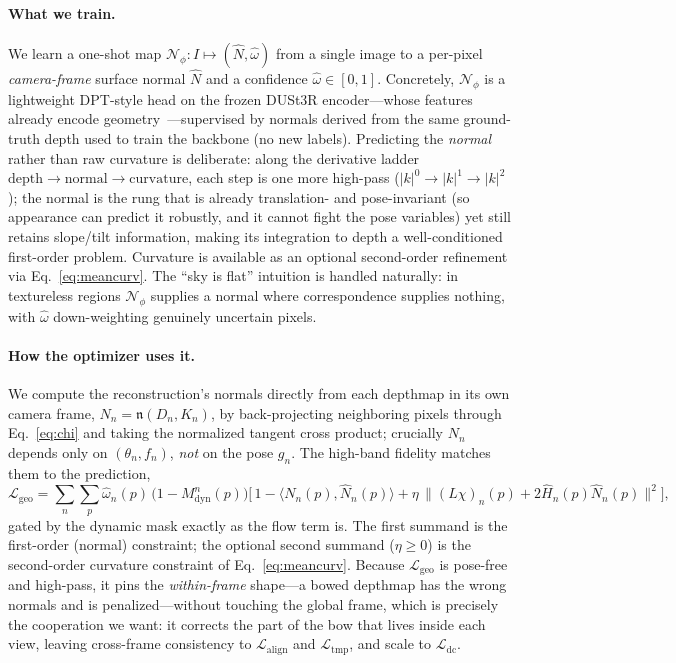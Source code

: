 \documentclass{article}
\begin{document}
\paragraph{What we train.}
We learn a one-shot map $\mathcal N_\phi: I\mapsto(\hat N,\hat\omega)$ from a
single image to a per-pixel \emph{camera-frame} surface normal $\hat N$ and a
confidence $\hat\omega\in[0,1]$. Concretely, $\mathcal N_\phi$ is a lightweight
DPT-style head on the frozen DUSt3R encoder---whose features already encode
geometry~\cite{han2026enhancing}---supervised by normals derived from the same
ground-truth depth used to train the backbone (no new labels). Predicting the
\emph{normal} rather than raw curvature is deliberate: along the derivative
ladder $\text{depth}\!\to\!\text{normal}\!\to\!\text{curvature}$, each step is
one more high-pass ($|k|^0\!\to\!|k|^1\!\to\!|k|^2$); the normal is the rung
that is already translation- and pose-invariant (so appearance can predict it
robustly, and it cannot fight the pose variables) yet still retains slope/tilt
information, making its integration to depth a well-conditioned first-order
problem. Curvature is available as an optional second-order refinement via
Eq.~\eqref{eq:meancurv}. The ``sky is flat'' intuition is handled naturally:
in textureless regions $\mathcal N_\phi$ supplies a normal where
correspondence supplies nothing, with $\hat\omega$ down-weighting genuinely
uncertain pixels.

\paragraph{How the optimizer uses it.}
We compute the reconstruction's normals directly from each depthmap in its own
camera frame, $N_n=\mathfrak n(D_n,K_n)$, by back-projecting neighboring pixels
through Eq.~\eqref{eq:chi} and taking the normalized tangent cross product;
crucially $N_n$ depends only on $(\theta_n,f_n)$, \emph{not} on the pose $g_n$.
The high-band fidelity matches them to the prediction,
\begin{equation}
\mathcal L_{\mathrm{geo}}
=\sum_n\sum_p
\hat\omega_n(p)\,\big(1-M^n_{\mathrm{dyn}}(p)\big)
\Big[\,1-\big\langle N_n(p),\hat N_n(p)\big\rangle
+\eta\,\big\|(L\chi)_n(p)+2\hat H_n(p)\hat N_n(p)\big\|^2\Big],
\label{eq:geo}
\end{equation}
gated by the dynamic mask exactly as the flow term is. The first summand is the
first-order (normal) constraint; the optional second summand ($\eta\!\ge\!0$)
is the second-order curvature constraint of Eq.~\eqref{eq:meancurv}. Because
$\mathcal L_{\mathrm{geo}}$ is pose-free and high-pass, it pins the
\emph{within-frame} shape---a bowed depthmap has the wrong normals and is
penalized---without touching the global frame, which is precisely the
cooperation we want: it corrects the part of the bow that lives inside each
view, leaving cross-frame consistency to $\mathcal L_{\mathrm{align}}$ and
$\mathcal L_{\mathrm{tmp}}$, and scale to $\mathcal L_{\mathrm{dc}}$.
\end{document}
